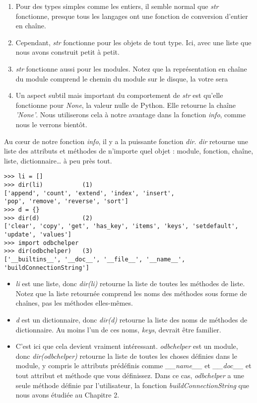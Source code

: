 \begin{enumerate}
    \item{Pour des types simples comme les entiers, il semble normal que \emph{str} fonctionne, presque tous les langages ont une fonction de conversion d’entier en chaîne.}
    \item{Cependant, \emph{str} fonctionne pour les objets de tout type. Ici, avec une liste que nous avons construit petit à petit.}
    \item{\emph{str} fonctionne aussi pour les modules. Notez que la représentation en chaîne du module comprend le chemin du module sur le disque, la votre sera}
    \item{Un aspect subtil mais important du comportement de \emph{str} est qu’elle fonctionne pour \emph{None}, la valeur nulle de Python. Elle retourne la chaîne \emph{'None'}. Nous  utiliserons cela à notre avantage dans la fonction \emph{info}, comme nous le verrons bientôt.}
\end{enumerate}

Au cœur de notre fonction \emph{info}, il y a la puissante fonction \emph{dir}. \emph{dir} retourne une liste des attributs et méthodes de n’importe quel objet : module, fonction, chaîne, liste, dictionnaire… à peu près tout.

\begin{example}
\begin{lstlisting}
>>> li = []
>>> dir(li)           (1)
['append', 'count', 'extend', 'index', 'insert',
'pop', 'remove', 'reverse', 'sort']
>>> d = {}
>>> dir(d)            (2)
['clear', 'copy', 'get', 'has_key', 'items', 'keys', 'setdefault', 'update', 'values']
>>> import odbchelper
>>> dir(odbchelper)   (3)
['__builtins__', '__doc__', '__file__', '__name__', 'buildConnectionString']
\end{lstlisting}
\end{example}

\begin{itemize}
\item{\emph{li} est une liste, donc \emph{dir(li)} retourne la liste de toutes les méthodes de liste. Notez que la liste retournée comprend les noms des méthodes sous forme de chaînes, pas les méthodes elles-mêmes.}
\item{\emph{d} est un dictionnaire, donc \emph{dir(d)} retourne la liste des noms de méthodes de dictionnaire. Au moins l’un de ces noms, \emph{keys}, devrait être familier.}
\item{C’est ici que cela devient vraiment intéressant. \emph{odbchelper} est un module, donc \emph{dir(odbchelper)} retourne la liste de toutes les choses définies dans le module, y compris le attributs prédéfinis comme \emph{\_\_name\_\_} et \emph{\_\_doc\_\_} et tout attribut et méthode que vous définissez. Dans ce cas, \emph{odbchelper} a une seule méthode définie par l’utilisateur, la fonction \emph{buildConnectionString} que nous avons étudiée au Chapitre 2.}
\end{itemize}

